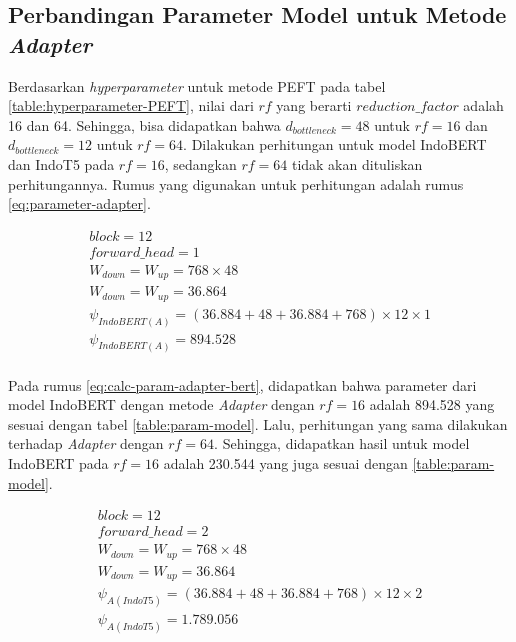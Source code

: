\subsection{Perbandingan Parameter Model untuk Metode \textit{Adapter}}

Berdasarkan \textit{hyperparameter} untuk metode PEFT pada tabel \ref{table:hyperparameter-PEFT}, nilai dari $rf$ yang berarti $reduction\_factor$ adalah 16 dan 64. Sehingga, bisa didapatkan bahwa $d_{bottleneck}=48$ untuk $rf=16$ dan $d_{bottleneck}=12$ untuk $rf=64$. Dilakukan perhitungan untuk model IndoBERT dan IndoT5 pada $rf=16$, sedangkan $rf=64$ tidak akan dituliskan perhitungannya. Rumus yang digunakan untuk perhitungan adalah rumus \ref{eq:parameter-adapter}.

\begin{equation}
    \begin{aligned}
        block = 12 \\ 
        forward\_head = 1 \\
        W_{down} = W_{up} = 768 \times 48 \\
        W_{down} = W_{up} = 36.864 \\
        \psi_{IndoBERT(A)} = (36.884 + 48 + 36.884 + 768) \times 12 \times 1 \\
        \psi_{IndoBERT(A)} = 894.528 \\
    \end{aligned}
    \label{eq:calc-param-adapter-bert}
\end{equation}

Pada rumus \ref{eq:calc-param-adapter-bert}, didapatkan bahwa parameter dari model IndoBERT dengan metode \textit{Adapter} dengan $rf=16$ adalah 894.528 yang sesuai dengan tabel \ref{table:param-model}. Lalu, perhitungan yang sama dilakukan terhadap \textit{Adapter} dengan $rf=64$. Sehingga, didapatkan hasil untuk model IndoBERT pada $rf=16$ adalah 230.544 yang juga sesuai dengan \ref{table:param-model}. 

\begin{equation}
    \begin{aligned}
        block = 12 \\ 
        forward\_head = 2 \\
        W_{down} = W_{up} = 768 \times 48 \\
        W_{down} = W_{up} = 36.864 \\
        \psi_{A(IndoT5)} = (36.884 + 48 + 36.884 + 768) \times 12 \times 2 \\
        \psi_{A(IndoT5)} = 1.789.056 \\
    \end{aligned}
    \label{eq:calc-param-adapter-t5}
\end{equation}

